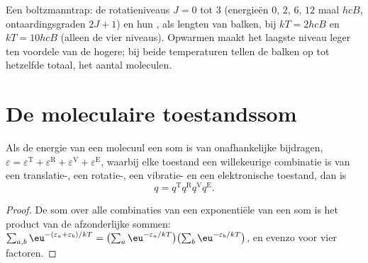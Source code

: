 \begin{omfigure}

{\small Een boltzmanntrap: de rotatieniveaus $J = 0$ tot 3 (energieën $0$,
$2$, $6$,
$12$ maal $hcB$, ontaardingsgraden $2J + 1$) en hun , als
lengten van balken,
bij $kT = 2hcB$ en $kT = 10hcB$ (alleen de vier niveaus). Opwarmen maakt het
laagste niveau leger ten voordele van de hogere; bij beide temperaturen
tellen de balken op tot hetzelfde totaal, het aantal moleculen.}
\end{omfigure}

\section{De moleculaire toestandssom}

\begin{proposition}[Factorisatie]\label{prop:b3:partition-functions:factorisation}
Als de energie van een molecuul een som is van onafhankelijke bijdragen,
$\varepsilon = \varepsilon^{\mathrm T} + \varepsilon^{\mathrm R} + \varepsilon^{\mathrm V} + \varepsilon^{\mathrm E}$, waarbij elke toestand
een willekeurige combinatie is van een translatie-, een rotatie-, een
vibratie- en een elektronische toestand, dan is
\[
  q = q^{\mathrm T}q^{\mathrm R}q^{\mathrm V}q^{\mathrm E}.
\]
\end{proposition}

\begin{proof}
De som over alle combinaties van een exponentiële van een som is het
product van de afzonderlijke sommen: $\sum_{a,b}\eu^{-(\varepsilon_a+\varepsilon_b)/kT} = \bigl(\sum_a\eu^{-\varepsilon_a/kT}\bigr)
\bigl(\sum_b\eu^{-\varepsilon_b/kT}\bigr)$, en evenzo voor vier factoren.
\end{proof}

